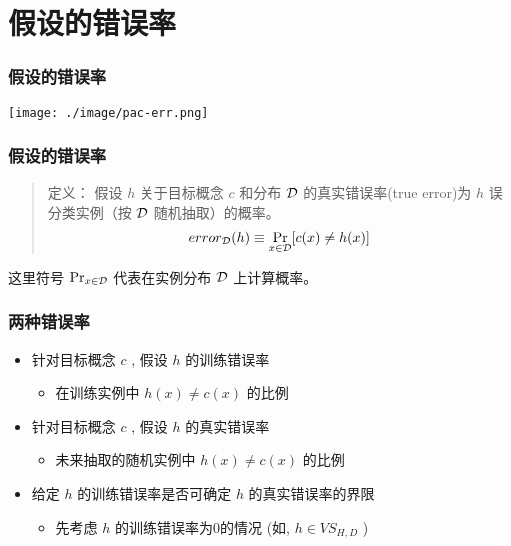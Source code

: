 \documentclass{beamer}
\begin{document}
\section{假设的错误率}
\label{sec-3}
\begin{frame}
\frametitle{假设的错误率}
\label{sec-3-1}

\texttt{[image: ./image/pac-err.png]}
\end{frame}
\begin{frame}
\frametitle{假设的错误率}
\label{sec-3-2}

\begin{quote}
定义： 假设 $h$ 关于目标概念 $c$ 和分布 $\cal{D}$ 的真实错误率(true error)为 $h$ 误分类实例（按 $\cal{D}$ 随机抽取）的概率。
$$error_{\cal{D}}(h) \equiv \Pr_{x \in \cal{D}}[c(x) \neq h(x)]$$
\end{quote}

这里符号 $\Pr_{x \in \cal{D}}$ 代表在实例分布 $\cal{D}$ 上计算概率。
\end{frame}
\begin{frame}
\frametitle{两种错误率}
\label{sec-3-3}


\begin{itemize}
\item 针对目标概念 $c$ , 假设 $h$ 的训练错误率
\begin{itemize}
\item 在训练实例中 $h(x) \neq c(x)$ 的比例
\end{itemize}
\item 针对目标概念 $c$ , 假设 $h$ 的真实错误率
\begin{itemize}
\item 未来抽取的随机实例中 $h(x) \neq c(x)$ 的比例
\end{itemize}
\item 给定 $h$ 的训练错误率是否可确定 $h$ 的真实错误率的界限
\begin{itemize}
\item 先考虑 $h$ 的训练错误率为0的情况 (如, $h \in VS_{H,D}$ )
\end{itemize}
\end{itemize}
\end{frame}
\end{document}
